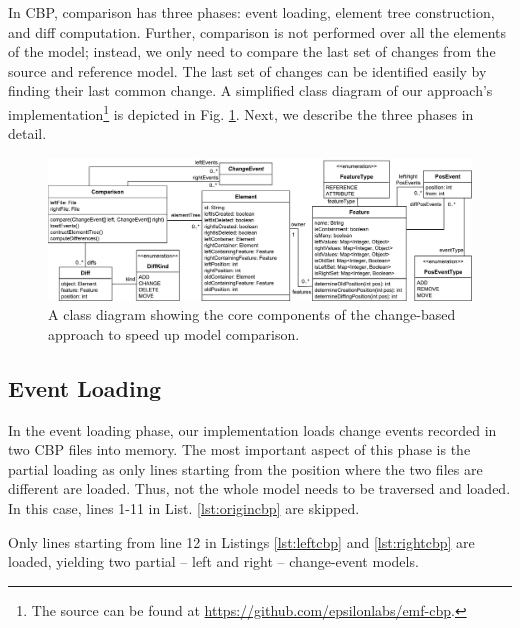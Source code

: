 \documentclass{jot}
\begin{document}
    In CBP, comparison has three phases: event loading, element tree construction, and diff computation.
    Further, comparison is not performed over all the elements of the model; instead, we only need to compare the last set of changes from the source and reference model.
    The last set of changes can be identified easily by finding their last common change.
    A simplified class diagram of our approach's implementation\footnote{The source can be found at \url{https://github.com/epsilonlabs/emf-cbp}.} is depicted in Fig. \ref{fig:approach_class_diagram}. 
    Next, we describe the three phases in detail.
    
    \begin{figure}
        \includegraphics[width=\linewidth]{TreeClassDiagram}
        \caption{A class diagram showing the core components of the change-based approach to speed up model comparison.}
        \label{fig:approach_class_diagram}
    \end{figure}
    
    
    \subsection{Event Loading}
    \label{sec:event_loading}
    In the event loading phase, our implementation loads change events recorded in two CBP files into memory.
    The most important aspect of this phase is the partial loading as only lines starting from the position where the two files are different are loaded.
    Thus, not the whole model needs to be traversed and loaded.
    In this case, lines 1-11 in List. \ref{lst:origincbp} are skipped.
    
    Only lines starting from line 12 in Listings \ref{lst:leftcbp} and \ref{lst:rightcbp} are loaded, yielding two partial -- left and right -- change-event models. 
    
\end{document}
